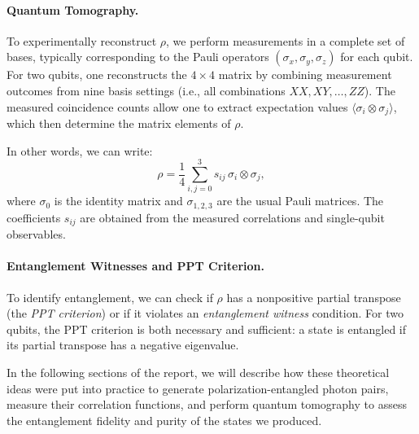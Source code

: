 \paragraph{Quantum Tomography.}
To experimentally reconstruct $\rho$, we perform measurements in a complete set of bases, typically corresponding to the Pauli operators $(\sigma_x, \sigma_y, \sigma_z)$ for each qubit. For two qubits, one reconstructs the $4\times 4$ matrix by combining measurement outcomes from nine basis settings (i.e., all combinations $XX, XY, \ldots, ZZ$). The measured coincidence counts allow one to extract expectation values $\langle \sigma_i \otimes \sigma_j \rangle$, which then determine the matrix elements of $\rho$. 

In other words, we can write:
\[
\rho = \frac{1}{4} \sum_{i,j=0}^{3} s_{ij}\,\sigma_i \otimes \sigma_j,
\]
where $\sigma_0$ is the identity matrix and $\sigma_{1,2,3}$ are the usual Pauli matrices. The coefficients $s_{ij}$ are obtained from the measured correlations and single-qubit observables.

\paragraph{Entanglement Witnesses and PPT Criterion.}
To identify entanglement, we can check if $\rho$ has a nonpositive partial transpose (the \emph{PPT criterion}) or if it violates an \emph{entanglement witness} condition. For two qubits, the PPT criterion is both necessary and sufficient: a state is entangled if its partial transpose has a negative eigenvalue.

\bigskip

\noindent
In the following sections of the report, we will describe how these theoretical ideas were put into practice to generate polarization-entangled photon pairs, measure their correlation functions, and perform quantum tomography to assess the entanglement fidelity and purity of the states we produced.
